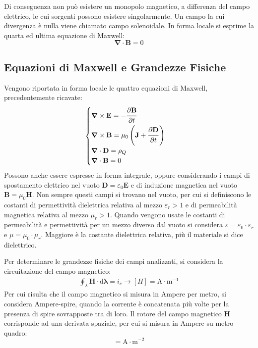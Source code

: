 \documentclass{article}
\newcommand{\vect}[1]{\boldsymbol{\mathbf{#1}}}
\newcommand{\df}{\mathrm{d}}
\newcommand{\SI}[1]{\mathrm{#1}}
\numberwithin{equation}{subsection}
\begin{document}
Di conseguenza non può esistere un monopolo magnetico, a differenza del campo elettrico, le cui sorgenti possono esistere singolarmente. Un campo la cui divergenza è nulla 
viene chiamato campo solenoidale. In forma locale si esprime la quarta ed ultima equazione di Maxwell:
\begin{equation}
    \vect\nabla\cdot\vect{B}=0
\end{equation}

\subsection{Equazioni di Maxwell e Grandezze Fisiche}

Vengono riportata in forma locale le quattro equazioni di Maxwell, precedentemente ricavate:
\begin{equation*}
    \begin{cases}
        \vect\nabla\times\vect{E}=-\displaystyle\frac{\strut \partial \vect{B}}{\strut \partial t}\\
        \vect\nabla\times\vect{B}=\mu_0\left(\vect{J}+\displaystyle\frac{\strut \partial \vect{D}}{\strut \partial t}\right)\\
        \vect\nabla\cdot\vect{D}=\rho_Q\\
        \vect\nabla\cdot\vect{B}=0
    \end{cases}
\end{equation*}
Possono anche essere espresse in forma integrale, oppure considerando i campi di spostamento elettrico nel vuoto $\vect{D}=\varepsilon_0\vect{E}$ e di induzione magnetica nel 
vuoto $\vect{B}=\mu_0\vect{H}$. Non sempre questi campi si trovano nel vuoto, per cui si definiscono le costanti di permettività dielettrica relativa al mezzo $\varepsilon_r>1$ 
e di permeabilità magnetica relativa al mezzo $\mu_r>1$. Quando vengono usate le costanti di permeabilità e permettività per un mezzo diverso dal vuoto si considera $\varepsilon=\varepsilon_0\cdot\varepsilon_r$ 
e $\mu=\mu_0\cdot\mu_r$. Maggiore è la costante dielettrica relativa, più il materiale si dice dielettrico. 

Per determinare le grandezze fisiche dei campi analizzati, si considera la circuitazione del campo magnetico:
\begin{gather*}
    \displaystyle\oint_{\lambda}\vect{H}\cdot \df\vect{\lambda}=i_c\to[H]=\SI{A}\cdot\SI{m}^{-1}
\end{gather*}
Per cui risulta che il campo magnetico si misura in Ampere per 
metro, si considera Ampere-spire, quando la corrente è concatenata più volte per la presenza di spire sovrapposte tra di loro. Il rotore del campo magnetico $\vect{H}$ 
corrisponde ad una derivata spaziale, per cui si misura in Ampere su metro quadro:
\begin{equation*}
    [\vect\nabla\times\vect{H}]=\SI{A}\cdot\SI{m}^{-2}
\end{equation*}
\end{document}
